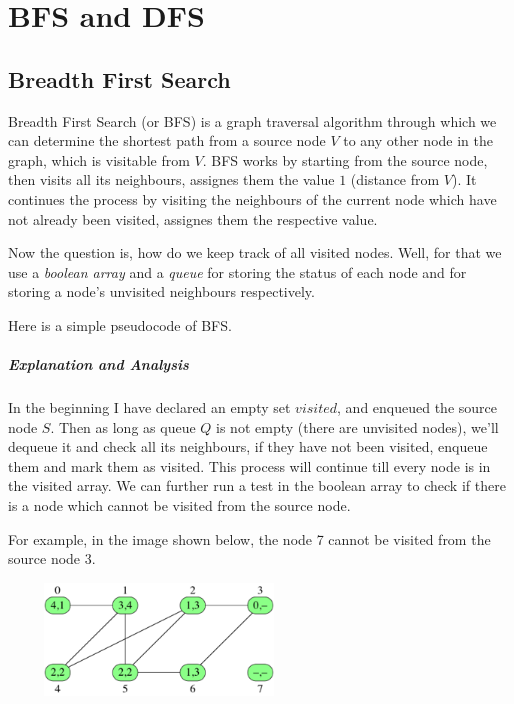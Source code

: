 \documentclass[11pt,a4paper]{extarticle}
\begin{document}
\section{BFS and DFS}
\subsection{Breadth First Search}
Breadth First Search (or BFS) is a graph traversal algorithm through which we can determine the shortest path from a source node $V$ to any other node in the graph, which is visitable from $V$. BFS works by starting from the source node, then visits all its neighbours, assignes them the value $1$ (distance from $V$). It continues the process by visiting the neighbours of the current node which have not already been visited, assignes them the respective value.

Now the question is, how do we keep track of all visited nodes. Well, for that we use a \textit{boolean array} and a \textit{queue} for storing the status of each node and for storing a node's unvisited neighbours respectively. 

Here is a simple pseudocode of BFS. 

\begin{adjustwidth}{2.5em}{0pt}

\end{adjustwidth}

\subparagraph{Explanation and Analysis}
In the beginning I have declared an empty set $visited$, and enqueued the source node $S$. Then as long as queue $Q$ is not empty (there are unvisited nodes), we'll dequeue it and check all its neighbours, if they have not been visited, enqueue them and mark them as visited. This process will continue till every node is in the visited array. We can further run a test in the boolean array to check if there is a node which cannot be visited from the source node.

For example, in the image shown below, the node 7 cannot be visited from the source node 3.

\begin{center}
	\includegraphics[width=8cm, height=3cm]{bfs}
\end{center}
\end{document}
